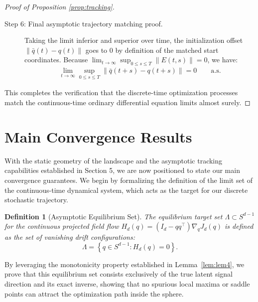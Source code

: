 \documentclass[10pt,a4paper]{amsart}
\newtheorem{definition}{Definition}
\begin{document}
\begin{proof}[Proof of Proposition \ref{prop:tracking}]
\begin{description}
    \item[Step 6: Final asymptotic trajectory matching proof.] Taking the limit inferior and superior over time, the initialization offset $\|\bar{q}(t) - q(t)\|$ goes to 0 by definition of the matched start coordinates. Because $\lim_{t \to \infty} \sup_{0 \le s \le T} \|E(t,s)\| = 0$, we have:
    \begin{align}
    \lim_{t \to \infty} \sup_{0 \le s \le T} \|\bar{q}(t+s) - q(t+s)\| = 0 \qquad \text{a.s.}
    \end{align}
\end{description}
This completes the verification that the discrete-time optimization processes match the continuous-time ordinary differential equation limits almost surely.
\end{proof}

\section{Main Convergence Results}

With the static geometry of the landscape and the asymptotic tracking capabilities established in Section 5, we are now positioned to state our main convergence guarantees. We begin by formalizing the definition of the limit set of the continuous-time dynamical system, which acts as the target for our discrete stochastic trajectory.

\begin{definition}[Asymptotic Equilibrium Set] \label{def:equilibrium_set}
The equilibrium target set $\Lambda \subset S^{d-1}$ for the continuous projected field flow $H_d(q) = (I_d - qq^\top)\nabla_q J_d(q)$ is defined as the set of vanishing drift configurations:
\begin{equation}
    \Lambda = \left\{ q \in S^{d-1} : H_d(q) = 0 \right\}.
\end{equation}
\end{definition}

\noindent By leveraging the monotonicity property established in Lemma~\ref{lem:lem4}, we prove that this equilibrium set consists exclusively of the true latent signal direction and its exact inverse, showing that no spurious local maxima or saddle points can attract the optimization path inside the sphere.
\end{document}
